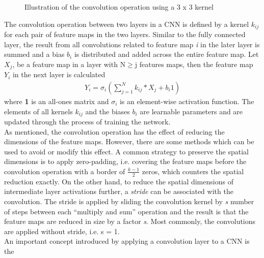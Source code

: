 \begin{enumerate}
\begin{figure}[H]
                        \caption{Illustration of the convolution operation using a 3 x 3 kernel}
                    \end{figure}
                    The convolution operation between two layers in a CNN is defined by a kernel \textbf{$k_{ij}$} for each pair of feature maps in the two layers. Similar to the fully connected layer,
                    the result from all convolutions related to feature map \emph{i} in the later layer is summed
                    and a bias $b_i$ is distributed and added across the entire feature map. Let \textbf{$X_j$}, be a feature map in a layer with N$\geq$j features maps, then the feature map \textbf{$Y_i$} in 
                    the next layer is calculated
                    \begin{align}
                        Y_i = \sigma_i (\displaystyle\sum_{j=1}^N k_{ij} * X_j + b_i 1)
                    \end{align}
                    where \textbf{1} is an all-ones matrix and $\sigma_i$
                    is an element-wise activation function. The
                    elements of all kernels \textbf{$k_{ij}$} and the biases \emph{$b_i$} are learnable parameters and are updated
                    through the process of training the network. \\ 
                    \vspace{3mm}
                    As mentioned, the convolution operation has the effect of reducing the dimensions
                    of the feature maps. However, there are some methods which can be used to avoid
                    or modify this effect. A common strategy to preserve the spatial dimensions is to
                    apply zero-padding, i.e. covering the feature maps before the convolution operation
                    with a border of $\frac{k-1}{2}$ zeros, which counters the spatial reduction exactly. On
                    the other hand, to reduce the spatial dimensions of intermediate layer activations
                    further, a \emph{stride} can be associated with the convolution. The stride is applied by
                    sliding the convolution kernel by \emph{s} number of steps between each “multiply and
                    sum” operation and the result is that the feature maps are reduced in size by a
                    factor \emph{s}. Most commonly, the convolutions are applied without stride, i.e. s = 1. \\ 
                    \vspace{3mm}
                    An important concept introduced by applying a convolution layer to a CNN is the

\end{enumerate}
